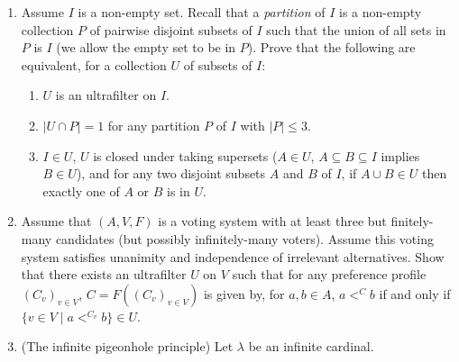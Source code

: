 \documentclass{amsart}
\theoremstyle{definition}
\begin{document}
\begin{enumerate}
  \item Assume $I$ is a non-empty set. Recall that a \emph{partition} of $I$ is a non-empty collection $P$ of pairwise disjoint subsets of $I$ such that the union of all sets in $P$ is $I$ (we allow the empty set to be in $P$). Prove that the following are equivalent, for a collection $U$ of subsets of $I$:

  \begin{enumerate}
  \item $U$ is an ultrafilter on $I$.
  \item $|U \cap P| = 1$ for any partition $P$ of $I$ with $|P| \le 3$.
  \item $I \in U$, $U$ is closed under taking supersets ($A \in U$, $A \subseteq B \subseteq I$ implies $B \in U$), and for any two disjoint subsets $A$ and $B$ of $I$, if $A \cup B \in U$ then exactly one of $A$ or $B$ is in $U$.
  \end{enumerate}

\item Assume that $(A, V, F)$ is a voting system with at least three but finitely-many candidates (but possibly infinitely-many voters). Assume this voting system satisfies unanimity and independence of irrelevant alternatives. Show that there exists an ultrafilter $U$ on $V$ such that for any preference profile $(C_v)_{v \in V}$, $C = F ((C_v)_{v \in V})$ is given by, for $a, b \in A$, $a <^C b$ if and only if $\{v \in V \mid a <^{C_v} b\} \in U$.
\item (The infinite pigeonhole principle) Let $\lambda$ be an infinite cardinal.


\end{enumerate}
\end{document}
